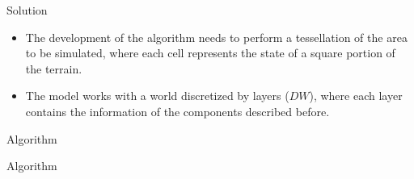 \documentclass{beamer}
\begin{document}
      \begin{frame}{Solution}
        \begin{itemize}
          \item<1-> The development of the algorithm needs to perform a tessellation of the area 
            to be simulated, where each cell represents the state of a square portion of the terrain. 
          \item<2-> The model works with a world discretized by layers ($DW$), where each layer contains 
            the information of the components described before.
        \end{itemize}
      \end{frame}
      
      \begin{frame}{Algorithm}
        \begin{algorithm}[H]
          \begin{algorithmic}
            \EndFor
          \end{algorithmic}
          \caption{Main Algorithm}
          \label{alg:main}
        \end{algorithm}
      \end{frame}
      
      \begin{frame}{Algorithm}
        \vspace{-0.5cm}
        \begin{algorithm}[H]
          \footnotesize
          \begin{algorithmic}
                \Else
                \EndIf
              \EndFor
              \EndFor
            \EndProcedure
          \end{algorithmic}
          \caption{Spreading Algorithm}
          \label{alg:spreading}
        \end{algorithm}
      \end{frame}
      
\end{document}
